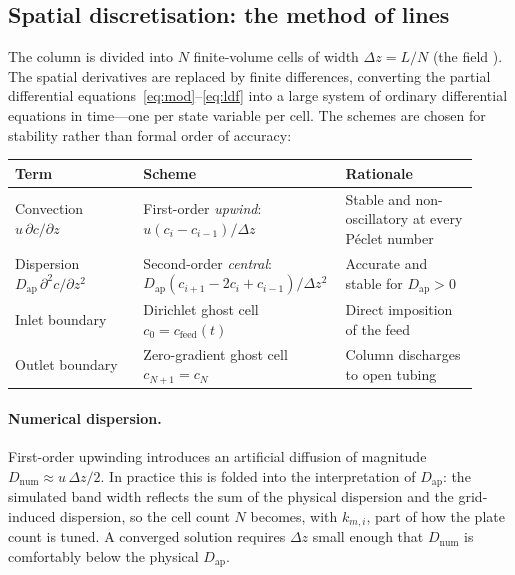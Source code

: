 \subsection{Spatial discretisation: the method of lines}
\label{sec:mol}

The column is divided into $N$ finite-volume cells of width $\Delta z = L/N$
(the field ). The spatial derivatives are replaced by finite
differences, converting the partial differential
equations~\eqref{eq:mod}--\eqref{eq:ldf} into a large system of ordinary
differential equations in time---one per state variable per cell. The schemes
are chosen for stability rather than formal order of accuracy:

\begin{center}
\renewcommand{\arraystretch}{1.35}
\begin{tabular}{@{}p{0.27\linewidth} p{0.36\linewidth} p{0.29\linewidth}@{}}
\toprule
\textbf{Term} & \textbf{Scheme} & \textbf{Rationale} \\
\midrule
Convection $u\,\partial c/\partial z$ &
First-order \emph{upwind}: $u(c_i - c_{i-1})/\Delta z$ &
Stable and non-oscillatory at every P\'eclet number \\
Dispersion $D_{\mathrm{ap}}\,\partial^2 c/\partial z^2$ &
Second-order \emph{central}: $D_{\mathrm{ap}}(c_{i+1}-2c_i+c_{i-1})/\Delta z^2$ &
Accurate and stable for $D_{\mathrm{ap}}>0$ \\
Inlet boundary & Dirichlet ghost cell $c_0 = c_{\mathrm{feed}}(t)$ &
Direct imposition of the feed \\
Outlet boundary & Zero-gradient ghost cell $c_{N+1}=c_N$ &
Column discharges to open tubing \\
\bottomrule
\end{tabular}
\end{center}

\paragraph{Numerical dispersion.}
First-order upwinding introduces an artificial diffusion of magnitude
$D_{\mathrm{num}} \approx u\,\Delta z/2$. In practice this is folded into the
interpretation of $D_{\mathrm{ap}}$: the simulated band width reflects the sum of
the physical dispersion and the grid-induced dispersion, so the cell count $N$
becomes, with $k_{m,i}$, part of how the plate count is tuned. A converged
solution requires $\Delta z$ small enough that $D_{\mathrm{num}}$ is comfortably
below the physical $D_{\mathrm{ap}}$.

